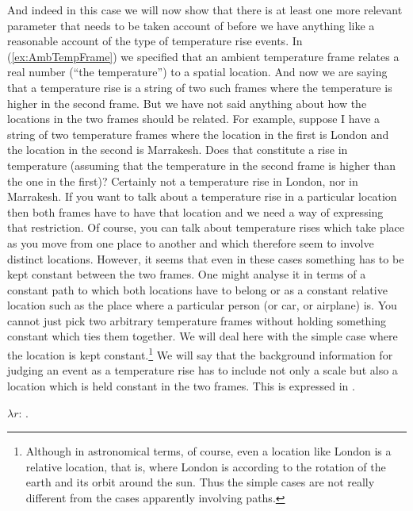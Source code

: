 And indeed in this case we will now show that there is at least one
more relevant parameter that needs to be taken account of before we
have anything like a reasonable account of the type of temperature
rise events.  In (\ref{ex:AmbTempFrame}) we specified that an ambient
temperature frame relates a real number (``the temperature'') to a
spatial location.  And now we are saying that a temperature rise is a
string of two such frames where the temperature is higher in the
second frame.  But we have not said anything about how the locations
in the two frames should be related.  For example, suppose I have a
string of two temperature frames where the location in the first is
London and the location in the second is Marrakesh.  Does that
constitute a rise in temperature (assuming that the temperature in the
second frame is higher than the one in the first)?  Certainly not a
temperature rise in London, nor in Marrakesh.  If you want to talk
about a temperature rise in a particular location then both frames
have to have that location and we need a way of expressing that
restriction.  Of course, you can talk about temperature rises which
take place as you move from one place to another and which therefore
seem to involve distinct locations.  However, it seems that even in
these cases something has to be kept constant between the two frames.
One might analyse it in terms of a constant path to which both
locations have to belong or as a constant relative location such as
the place where a particular person (or car, or airplane) is.  You
cannot just pick two arbitrary temperature frames without holding
something constant which ties them together.  We will deal here with
the simple case where the location is kept constant.\footnote{Although
  in astronomical terms, of course, even a location like London is a
  relative location, that is, where London is according to the
  rotation of the earth and its orbit around the sun.  Thus the simple
  cases are not really different from the cases apparently involving
  paths.}  We will say that the background information for judging an
event as a temperature rise has to
include not only a scale but also a location which is held constant in
the two frames.  This is expressed in \nexteg{}.
\begin{ex} 
$\lambda r$: .\\  
\hspace*{2em} 
\label{ex:temprisefixloc}
\end{ex} 
